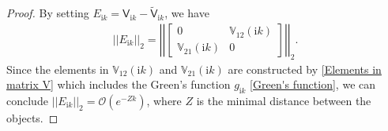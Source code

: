 \begin{proof}
    By setting $E_{\mathrm{i}k} = \mathsf{V}_{\mathrm{i}k} - \tilde{\mathsf{V}}_{\mathrm{i}k}$, we have 
    \begin{align*}
        ||E_{\mathrm{i}k}||_{2} = \left|\left|\begin{bmatrix}
            0 & \mathbb{V}_{12}(\mathrm{i}k)\\
            \mathbb{V}_{21}(\mathrm{i}k) & 0
        \end{bmatrix}\right|\right|_{2}.
    \end{align*}
    Since the elements in $\mathbb{V}_{12}(\mathrm{i}k)$ and $\mathbb{V}_{21}(\mathrm{i}k)$ are constructed by \eqref{Elements in matrix V} which includes the 
    Green's function $g_{\mathrm{i}k}$ \eqref{Green's function}, we can conclude $||E_{\mathrm{i}k}||_{2} = \mathcal{O}(e^{-Zk})$, where
    $Z$ is the minimal distance between the objects. 


\end{proof}
